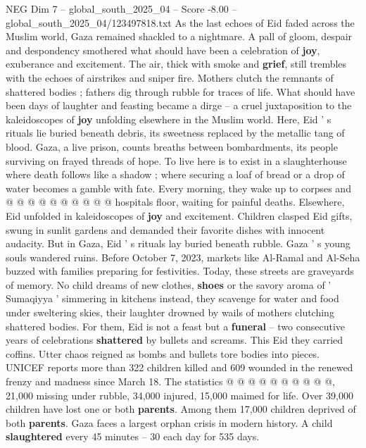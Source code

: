 \begin{textsample}{NEG Dim 7 – global\_south\_2025\_04 – Score -8.00 – global\_south\_2025\_04/123497818.txt}  \label{ex:f7_neg_301}
As the last echoes of Eid faded across the Muslim world, Gaza remained shackled to a nightmare.
A pall of gloom, despair and despondency smothered what should have been a celebration of \textbf{joy}, exuberance and excitement.
The air, thick with smoke and \textbf{grief}, still trembles with the echoes of airstrikes and sniper fire.
Mothers clutch the remnants of shattered bodies ; fathers dig through rubble for traces of life.
What should have been days of laughter and feasting became a dirge -- a cruel juxtaposition to the kaleidoscopes of \textbf{joy} unfolding elsewhere in the Muslim world.
Here, Eid ' s rituals lie buried beneath debris, its sweetness replaced by the metallic tang of blood.
Gaza, a live prison, counts breaths between bombardments, its people surviving on frayed threads of hope.
To live here is to exist in a slaughterhouse where death follows like a shadow ; where securing a loaf of bread or a drop of water becomes a gamble with fate.
Every morning, they wake up to corpses and @ @ @ @ @ @ @ @ @ @ hospitals floor, waiting for painful deaths.
Elsewhere, Eid unfolded in kaleidoscopes of \textbf{joy} and excitement.
Children clasped Eid gifts, swung in sunlit gardens and demanded their favorite dishes with innocent audacity.
But in Gaza, Eid ' s rituals lay buried beneath rubble.
Gaza ' s young souls wandered ruins.
Before October 7, 2023, markets like Al-Ramal and Al-Seha buzzed with families preparing for festivities.
Today, these streets are graveyards of memory.
No child dreams of new clothes, \textbf{shoes} or the savory aroma of ' Sumaqiyya ' simmering in kitchens instead, they scavenge for water and food under sweltering skies, their laughter drowned by wails of mothers clutching shattered bodies.
For them, Eid is not a feast but a \textbf{funeral} -- two consecutive years of celebrations \textbf{shattered} by bullets and screams.
This Eid they carried coffins.
Utter chaos reigned as bombs and bullets tore bodies into pieces.
UNICEF reports more than 322 children killed and 609 wounded in the renewed frenzy and madness since March 18.
The statistics @ @ @ @ @ @ @ @ @ @, 21,000 missing under rubble, 34,000 injured, 15,000 maimed for life.
Over 39,000 children have lost one or both \textbf{parents}.
Among them 17,000 children deprived of both \textbf{parents}.
Gaza faces a largest orphan crisis in modern history.
A child \textbf{slaughtered} every 45 minutes -- 30 each day for 535 days.

\end{textsample}
